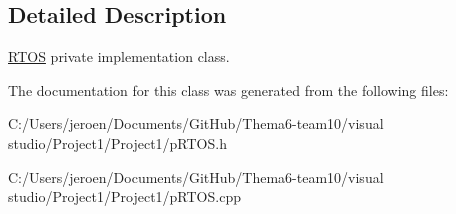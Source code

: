 \subsection{Detailed Description}
\hyperlink{class_r_t_o_s}{R\+T\+OS} private implementation class. 

The documentation for this class was generated from the following files\+:\begin{DoxyCompactItemize}
\item 
C\+:/\+Users/jeroen/\+Documents/\+Git\+Hub/\+Thema6-\/team10/visual studio/\+Project1/\+Project1/p\+R\+T\+O\+S.\+h\item 
C\+:/\+Users/jeroen/\+Documents/\+Git\+Hub/\+Thema6-\/team10/visual studio/\+Project1/\+Project1/p\+R\+T\+O\+S.\+cpp\end{DoxyCompactItemize}
